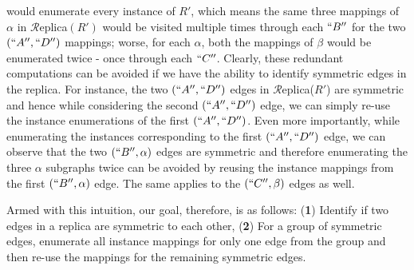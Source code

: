 would enumerate every instance of $R'$, which means the same three mappings of
$\alpha$ in $\mathcal{R}$eplica$(R')$ would be visited multiple times through
each $``B''$ for the two $(``A'',``D'')$ mappings; worse, for each $\alpha$,
both the mappings of $\beta$ would be enumerated twice - once through each
$``C''$. %
Clearly, these redundant computations can be avoided if we have the ability to
identify symmetric edges in the replica. For instance, the two $(``A'',``D'')$
edges in $\mathcal{R}$eplica($R'$) are symmetric and hence while considering the
second $(``A'',``D'')$ edge, we can simply re-use the instance enumerations of
the first $(``A'',``D'')$. Even more importantly, while enumerating the
instances corresponding to the first $(``A'',``D'')$ edge, we can observe that
the two $(``B'',\alpha)$ edges are symmetric and therefore enumerating the three
$\alpha$ subgraphs twice can be avoided by reusing the instance mappings from
the first $(``B'',\alpha)$ edge. The same applies to the $(``C'',\beta)$ edges
as well.%

Armed with this intuition, our goal, therefore, is as follows: ({\bf 1}) Identify if two edges in a replica are symmetric to each other, ({\bf 2}) For a group of symmetric edges, enumerate all instance mappings for only one edge from the group and then re-use the mappings for the remaining symmetric edges.

\vspace{-0.05in}
